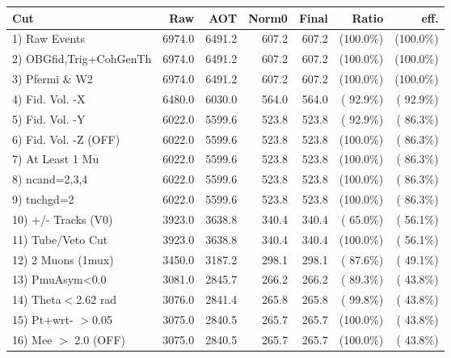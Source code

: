  \begin{table}[h!]\centering
 \begin{tabular}{||l||r|r|r|r|r|r||}
 \hline
 \hline
 Cut & Raw & AOT & Norm0 & Final & Ratio & eff.       \\
 \hline
  1) Raw Events           &       6974.0 &       6491.2 &        607.2 &        607.2 & (100.0\%) & (100.0\%) \\
  2) OBGfid,Trig+CohGenTh &       6974.0 &       6491.2 &        607.2 &        607.2 & (100.0\%) & (100.0\%) \\
  3) Pfermi \& W2         &       6974.0 &       6491.2 &        607.2 &        607.2 & (100.0\%) & (100.0\%) \\
  4) Fid. Vol. -X         &       6480.0 &       6030.0 &        564.0 &        564.0 & ( 92.9\%) & ( 92.9\%) \\
  5) Fid. Vol. -Y         &       6022.0 &       5599.6 &        523.8 &        523.8 & ( 92.9\%) & ( 86.3\%) \\
  6) Fid. Vol. -Z (OFF)   &       6022.0 &       5599.6 &        523.8 &        523.8 & (100.0\%) & ( 86.3\%) \\
  7) At Least 1 Mu        &       6022.0 &       5599.6 &        523.8 &        523.8 & (100.0\%) & ( 86.3\%) \\
  8) ncand=2,3,4          &       6022.0 &       5599.6 &        523.8 &        523.8 & (100.0\%) & ( 86.3\%) \\
  9) tnchgd=2             &       6022.0 &       5599.6 &        523.8 &        523.8 & (100.0\%) & ( 86.3\%) \\
 10) +/- Tracks (V0)      &       3923.0 &       3638.8 &        340.4 &        340.4 & ( 65.0\%) & ( 56.1\%) \\
 11) Tube/Veto Cut        &       3923.0 &       3638.8 &        340.4 &        340.4 & (100.0\%) & ( 56.1\%) \\
 12) 2 Muons (1mux)       &       3450.0 &       3187.2 &        298.1 &        298.1 & ( 87.6\%) & ( 49.1\%) \\
 13) PmuAsym<0.0          &       3081.0 &       2845.7 &        266.2 &        266.2 & ( 89.3\%) & ( 43.8\%) \\
 14) Theta$<$2.62 rad     &       3076.0 &       2841.4 &        265.8 &        265.8 & ( 99.8\%) & ( 43.8\%) \\
 15) Pt+wrt- $>$0.05      &       3075.0 &       2840.5 &        265.7 &        265.7 & (100.0\%) & ( 43.8\%) \\
 16) Mee $>$ 2.0  (OFF)   &       3075.0 &       2840.5 &        265.7 &        265.7 & (100.0\%) & ( 43.8\%) \\

\end{tabular}
\end{table}
